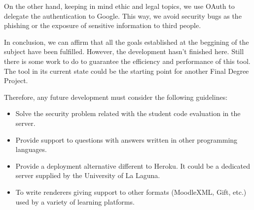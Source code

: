 
On the other hand, keeping in mind ethic and legal topics, we use OAuth to delegate the authentication to Google. This way, we avoid security bugs as the phishing or the exposure of sensitive 
information to third people.
\bigskip


In conclusion, we can affirm that all the goals  established at the
beggining of the subject have been fulfilled. However, the development hasn't finished here. Still there is some work to do to guarantee the efficiency and performance of this tool. The tool in its current state could be the starting point for another Final Degree Project.
\bigskip


Therefore, any future development must consider the following guidelines:

\begin{itemize}
  \item Solve the security problem related with the student code evaluation in the server.
  \item Provide support to questions with answers written in other programming languages.
  \item Provide a deployment alternative different to Heroku. It could be a dedicated server supplied by the University of La Laguna.
  \item  To write renderers giving support to other formats (MoodleXML, Gift, etc.) used by a variety of learning platforms.
\end{itemize}
